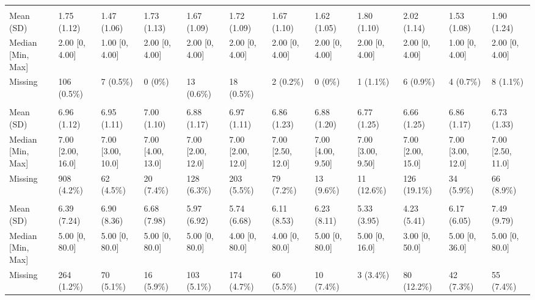 \documentclass[
  single column]{article}
\begin{document}
\begin{landscape}
\begin{tabular}[t]{llllllllllll}
\addlinespace[0.3em]
\multicolumn{12}{l}{\textbf{Fatigue}}\\
\hspace{1em}Mean (SD) & 1.75 (1.12) & 1.47 (1.06) & 1.73 (1.13) & 1.67 (1.09) & 1.72 (1.09) & 1.67 (1.10) & 1.62 (1.05) & 1.80 (1.10) & 2.02 (1.14) & 1.53 (1.08) & 1.90 (1.24)\\
\hspace{1em}Median [Min, Max] & 2.00 [0, 4.00] & 1.00 [0, 4.00] & 2.00 [0, 4.00] & 2.00 [0, 4.00] & 2.00 [0, 4.00] & 2.00 [0, 4.00] & 2.00 [0, 4.00] & 2.00 [0, 4.00] & 2.00 [0, 4.00] & 1.00 [0, 4.00] & 2.00 [0, 4.00]\\
\hspace{1em}Missing & 106 (0.5\%) & 7 (0.5\%) & 0 (0\%) & 13 (0.6\%) & 18 (0.5\%) & 2 (0.2\%) & 0 (0\%) & 1 (1.1\%) & 6 (0.9\%) & 4 (0.7\%) & 8 (1.1\%)\\
\addlinespace[0.3em]
\multicolumn{12}{l}{\textbf{Sleep}}\\
\hspace{1em}Mean (SD) & 6.96 (1.12) & 6.95 (1.11) & 7.00 (1.10) & 6.88 (1.17) & 6.97 (1.11) & 6.86 (1.23) & 6.88 (1.20) & 6.77 (1.25) & 6.66 (1.25) & 6.86 (1.17) & 6.73 (1.33)\\
\hspace{1em}Median [Min, Max] & 7.00 [2.00, 16.0] & 7.00 [3.00, 10.0] & 7.00 [4.00, 13.0] & 7.00 [2.00, 12.0] & 7.00 [2.00, 12.0] & 7.00 [2.50, 12.0] & 7.00 [4.00, 9.50] & 7.00 [3.00, 9.50] & 7.00 [2.00, 15.0] & 7.00 [3.00, 12.0] & 7.00 [2.50, 11.0]\\
\hspace{1em}Missing & 908 (4.2\%) & 62 (4.5\%) & 20 (7.4\%) & 128 (6.3\%) & 203 (5.5\%) & 79 (7.2\%) & 13 (9.6\%) & 11 (12.6\%) & 126 (19.1\%) & 34 (5.9\%) & 66 (8.9\%)\\
\addlinespace[0.3em]
\multicolumn{12}{l}{\textbf{Hours Exercising per Week}}\\
\hspace{1em}Mean (SD) & 6.39 (7.24) & 6.90 (8.36) & 6.68 (7.98) & 5.97 (6.92) & 5.74 (6.68) & 6.11 (8.53) & 6.23 (8.11) & 5.33 (3.95) & 4.23 (5.41) & 6.17 (6.05) & 7.49 (9.79)\\
\hspace{1em}Median [Min, Max] & 5.00 [0, 80.0] & 5.00 [0, 80.0] & 5.00 [0, 80.0] & 5.00 [0, 80.0] & 4.00 [0, 80.0] & 4.00 [0, 80.0] & 5.00 [0, 80.0] & 5.00 [0, 16.0] & 3.00 [0, 50.0] & 5.00 [0, 36.0] & 5.00 [0, 80.0]\\
\hspace{1em}Missing & 264 (1.2\%) & 70 (5.1\%) & 16 (5.9\%) & 103 (5.1\%) & 174 (4.7\%) & 60 (5.5\%) & 10 (7.4\%) & 3 (3.4\%) & 80 (12.2\%) & 42 (7.3\%) & 55 (7.4\%)\\

\end{tabular}
\end{landscape}
\end{document}
